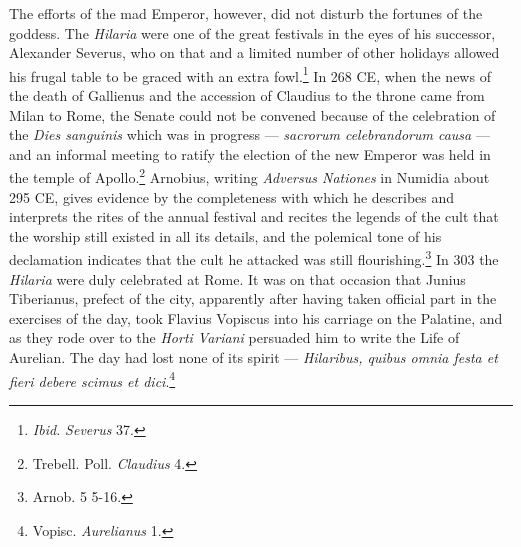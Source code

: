\documentclass[a4paper, 11pt, oneside, polutonikogreek, english]{article}
\begin{document}
The efforts of the mad Emperor, however, did not disturb the fortunes of the goddess. The \emph{Hilaria} were one of the great festivals in the eyes of his successor, Alexander Severus, who on that and a limited number of other holidays allowed his frugal table to be graced with an extra fowl.\footnote{\emph{Ibid.} \emph{Severus} 37.} In 268 \textsc{CE}, when the news of the death of Gallienus and the accession of Claudius to the throne came from Milan to Rome, the Senate could not be convened because of the celebration of the \emph{Dies sanguinis} which was in progress --- \emph{sacrorum celebrandorum causa} --- and an informal meeting to ratify the election of the new Emperor was held in the temple of Apollo.\footnote{Trebell. Poll. \emph{Claudius} 4.} Arnobius, writing \emph{Adversus Nationes} in Numidia about 295 \textsc{CE}, gives evidence by the completeness with which he describes and interprets the rites of the annual festival and recites the legends of the cult that the worship still existed in all its details, and the polemical tone of his declamation indicates that the cult he attacked was still flourishing.\footnote{Arnob. 5 5-16.} In 303 the \emph{Hilaria} were duly celebrated at Rome. It was on that occasion that Junius Tiberianus, prefect of the city, apparently after having taken official part in the exercises of the day, took Flavius Vopiscus into his carriage on the Palatine, and as they rode over to the \emph{Horti Variani} persuaded him to write the Life of Aurelian. The day had lost none of its spirit --- \emph{Hilaribus, quibus omnia festa et fieri debere scimus et dici}.\footnote{Vopisc. \emph{Aurelianus} 1.}
\end{document}
